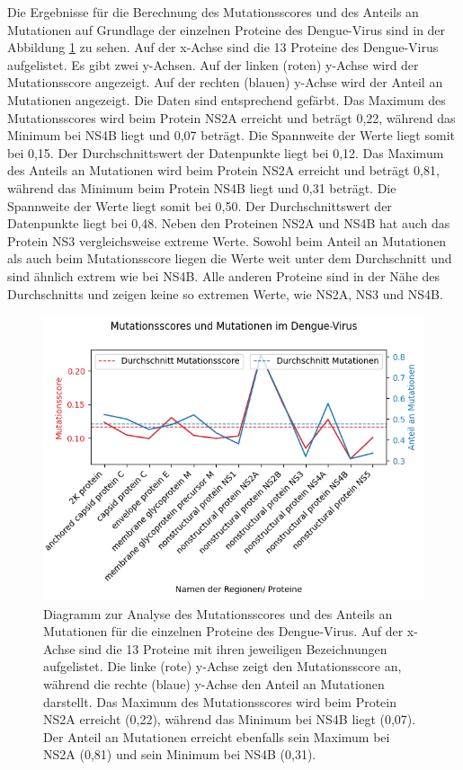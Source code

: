 \documentclass[german,version-2022-01]{uzl-thesis}
\begin{document}
Die Ergebnisse f\"ur die Berechnung des Mutationsscores und des Anteils an Mutationen auf Grundlage der einzelnen Proteine des Dengue-Virus sind in der Abbildung \ref{fig:Dengue_virus_scores_and_mutations_namen} zu sehen. Auf der x-Achse sind die 13 Proteine des Dengue-Virus aufgelistet. Es gibt zwei y-Achsen. Auf der linken (roten) y-Achse wird der Mutationsscore angezeigt. Auf der rechten (blauen) y-Achse wird der Anteil an Mutationen angezeigt. Die Daten sind entsprechend gef\"arbt. Das Maximum des Mutationsscores wird beim Protein NS2A erreicht und betr\"agt 0,22, w\"ahrend das Minimum bei NS4B liegt und 0,07 betr\"agt. Die Spannweite der Werte liegt somit bei 0,15. Der Durchschnittswert der Datenpunkte liegt bei 0,12. Das Maximum des Anteils an Mutationen wird beim Protein NS2A erreicht und betr\"agt 0,81, w\"ahrend das Minimum beim Protein NS4B liegt und 0,31 betr\"agt. Die Spannweite der Werte liegt somit bei 0,50. Der Durchschnittswert der Datenpunkte liegt bei 0,48. Neben den Proteinen NS2A und NS4B hat auch das Protein NS3 vergleichsweise extreme Werte. Sowohl beim Anteil an Mutationen als auch beim Mutationsscore liegen die Werte weit unter dem Durchschnitt und sind \"ahnlich extrem wie bei NS4B. Alle anderen Proteine sind in der N\"ahe des Durchschnitts und zeigen keine so extremen Werte, wie NS2A, NS3 und NS4B. 
\begin{figure}[tbp]
  \centering
  \includegraphics[scale=0.65]{Images/Diagramm_Scores_und_Mutationen_Dengue_viren_Namen.png}
  \caption{Diagramm zur Analyse des Mutationsscores und des Anteils an Mutationen f\"ur die einzelnen Proteine des Dengue-Virus. Auf der x-Achse sind die 13 Proteine mit ihren jeweiligen Bezeichnungen aufgelistet. Die linke (rote) y-Achse zeigt den Mutationsscore an, w\"ahrend die rechte (blaue) y-Achse den Anteil an Mutationen darstellt. Das Maximum des Mutationsscores wird beim Protein NS2A erreicht (0,22), w\"ahrend das Minimum bei NS4B liegt (0,07). Der Anteil an Mutationen erreicht ebenfalls sein Maximum bei NS2A (0,81) und sein Minimum bei NS4B (0,31).}
  \label{fig:Dengue_virus_scores_and_mutations_namen}
\end{figure}
\end{document}
